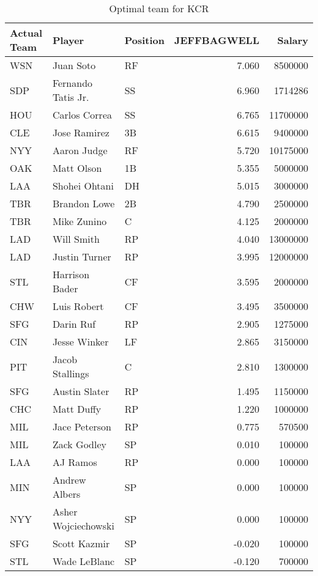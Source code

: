 \begin{table}

\caption{Optimal team for KCR}
\centering
\begin{tabular}[t]{l|l|l|r|r}
\hline
Actual Team & Player & Position & JEFFBAGWELL & Salary\\
\hline
WSN & Juan Soto & RF & 7.060 & 8500000\\
\hline
SDP & Fernando Tatis Jr. & SS & 6.960 & 1714286\\
\hline
HOU & Carlos Correa & SS & 6.765 & 11700000\\
\hline
CLE & Jose Ramirez & 3B & 6.615 & 9400000\\
\hline
NYY & Aaron Judge & RF & 5.720 & 10175000\\
\hline
OAK & Matt Olson & 1B & 5.355 & 5000000\\
\hline
LAA & Shohei Ohtani & DH & 5.015 & 3000000\\
\hline
TBR & Brandon Lowe & 2B & 4.790 & 2500000\\
\hline
TBR & Mike Zunino & C & 4.125 & 2000000\\
\hline
LAD & Will Smith & RP & 4.040 & 13000000\\
\hline
LAD & Justin Turner & RP & 3.995 & 12000000\\
\hline
STL & Harrison Bader & CF & 3.595 & 2000000\\
\hline
CHW & Luis Robert & CF & 3.495 & 3500000\\
\hline
SFG & Darin Ruf & RP & 2.905 & 1275000\\
\hline
CIN & Jesse Winker & LF & 2.865 & 3150000\\
\hline
PIT & Jacob Stallings & C & 2.810 & 1300000\\
\hline
SFG & Austin Slater & RP & 1.495 & 1150000\\
\hline
CHC & Matt Duffy & RP & 1.220 & 1000000\\
\hline
MIL & Jace Peterson & RP & 0.775 & 570500\\
\hline
MIL & Zack Godley & SP & 0.010 & 100000\\
\hline
LAA & AJ Ramos & RP & 0.000 & 100000\\
\hline
MIN & Andrew Albers & SP & 0.000 & 100000\\
\hline
NYY & Asher Wojciechowski & SP & 0.000 & 100000\\
\hline
SFG & Scott Kazmir & SP & -0.020 & 100000\\
\hline
STL & Wade LeBlanc & SP & -0.120 & 700000\\
\hline
\end{tabular}
\end{table}
